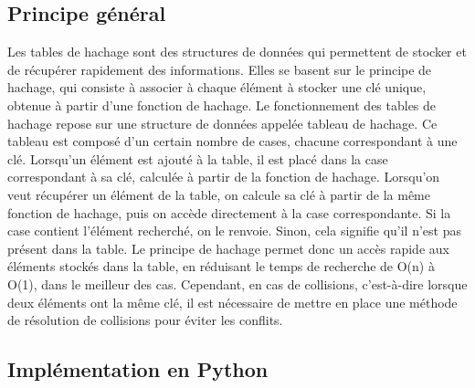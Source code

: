 \documentclass[12pt]{article}
\begin{document}
    \subsection{Principe général}\label{subsec:principe-general}
    Les tables de hachage sont des structures de données qui permettent de stocker et de récupérer rapidement des informations.
    Elles se basent sur le principe de hachage, qui consiste à associer à chaque élément à stocker une clé unique, obtenue à partir d'une fonction de hachage.
    Le fonctionnement des tables de hachage repose sur une structure de données appelée tableau de hachage.
    Ce tableau est composé d'un certain nombre de cases, chacune correspondant à une clé.
    Lorsqu'un élément est ajouté à la table, il est placé dans la case correspondant à sa clé, calculée à partir de la fonction de hachage.
    Lorsqu'on veut récupérer un élément de la table, on calcule sa clé à partir de la même fonction de hachage, puis on accède directement à la case correspondante.
    Si la case contient l'élément recherché, on le renvoie.
    Sinon, cela signifie qu'il n'est pas présent dans la table.
    Le principe de hachage permet donc un accès rapide aux éléments stockés dans la table, en réduisant le temps de recherche de O(n) à O(1), dans le meilleur des cas.
    Cependant, en cas de collisions, c'est-à-dire lorsque deux éléments ont la même clé, il est nécessaire de mettre en place une méthode de résolution de collisions pour éviter les conflits.

    \subsection{Implémentation en Python}\label{subsec:implementation-en-python}
\end{document}
